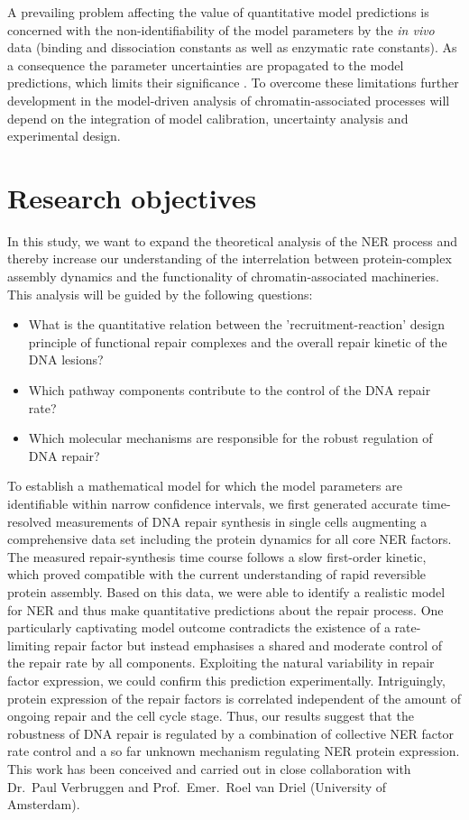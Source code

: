 A prevailing problem affecting the value of quantitative model predictions is concerned with the non-identifiability of the model parameters by the \textit{in vivo} data (binding and dissociation constants as well as enzymatic rate constants). As a consequence the parameter uncertainties are propagated to the model predictions, which limits their significance \cite{Raue2013}. To overcome these limitations further development in the model-driven analysis of chromatin-associated processes will depend on the integration of model calibration, uncertainty analysis and experimental design.     
  

\section{Research objectives}

In this study, we want to expand the theoretical analysis of the NER process and thereby increase our understanding of the interrelation between protein-complex assembly dynamics and the functionality of chromatin-associated machineries. This analysis will be guided by the following questions:

\begin{itemize}
	\item What is the quantitative relation between the 'recruitment-reaction' design principle of functional repair complexes and the overall repair kinetic of the DNA lesions?
	
	\item Which pathway components contribute to the control of the DNA repair rate? 
	
	\item Which molecular mechanisms are responsible for the robust regulation of DNA repair? 
\end{itemize} 


To establish a mathematical model for which the model parameters are identifiable within narrow confidence intervals, we first generated accurate time-resolved measurements of DNA repair synthesis in single cells augmenting a comprehensive data set including the protein dynamics for all core NER factors. The measured repair-synthesis time course follows a slow first-order kinetic, which proved compatible with the current understanding of rapid reversible protein assembly. Based on this data, we were able to identify a realistic model for NER and thus make quantitative predictions about the repair process. One particularly captivating model outcome contradicts the existence of a rate-limiting repair factor but instead emphasises a shared and moderate control of the repair rate by all components. Exploiting the natural variability in repair factor expression, we could confirm this prediction experimentally. Intriguingly, protein expression of the repair factors is correlated independent of the amount of ongoing repair and the cell cycle stage. Thus, our results suggest that the robustness of DNA repair is regulated by a combination of collective NER factor rate control and a so far unknown mechanism regulating NER protein expression.\\   

This work has been conceived and carried out in close collaboration with Dr.\ Paul Verbruggen and Prof.\ Emer.\ Roel van Driel (University of Amsterdam).





